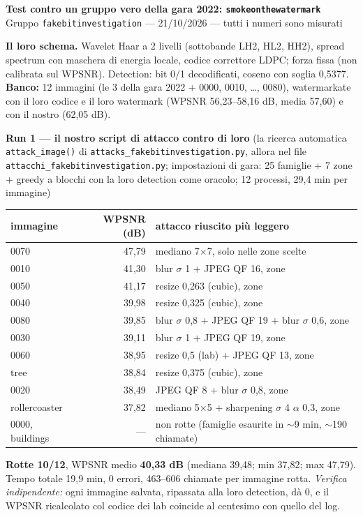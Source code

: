 \documentclass[10pt,a4paper]{article}
\begin{document}
{\Large\bfseries Test contro un gruppo vero della gara 2022: \texttt{smokeonthewatermark}}\\[2pt]
{\small Gruppo \texttt{fakebitinvestigation} — 21/10/2026 — tutti i numeri sono misurati}

\textbf{Il loro schema.} Wavelet Haar a 2 livelli (sottobande LH2, HL2, HH2), spread spectrum con maschera di energia locale, codice correttore LDPC; forza fissa (non calibrata sul WPSNR). Detection: bit 0/1 decodificati, coseno con soglia 0,5377. \textbf{Banco:} 12 immagini (le 3 della gara 2022 + 0000, 0010, \dots, 0080), watermarkate con il loro codice e il loro watermark (WPSNR 56,23–58,16 dB, media 57,60) e con il nostro (62,05 dB).

\medskip
\textbf{Run 1 — il nostro script di attacco contro di loro} (la ricerca automatica \texttt{attack\_image()} di \texttt{attacks\_fakebitinvestigation.py}, allora nel file \texttt{attacchi\_fakebitinvestigation.py}; impostazioni di gara: 25 famiglie + 7 zone + greedy a blocchi con la loro detection come oracolo; 12 processi, 29{,}4 min per immagine)

\begin{tabularx}{\linewidth}{@{}l r X@{}}
\toprule
immagine & WPSNR (dB) & attacco riuscito più leggero \\
\midrule
0070 & 47,79 & mediano 7$\times$7, solo nelle zone scelte \\
0010 & 41,30 & blur $\sigma$ 1 + JPEG QF 16, zone \\
0050 & 41,17 & resize 0,263 (cubic), zone \\
0040 & 39,98 & resize 0,325 (cubic), zone \\
0080 & 39,85 & blur $\sigma$ 0,8 + JPEG QF 19 + blur $\sigma$ 0,6, zone \\
0030 & 39,11 & blur $\sigma$ 1 + JPEG QF 19, zone \\
0060 & 38,95 & resize 0,5 (lab) + JPEG QF 13, zone \\
tree & 38,84 & resize 0,375 (cubic), zone \\
0020 & 38,49 & JPEG QF 8 + blur $\sigma$ 0,8, zone \\
rollercoaster & 37,82 & mediano 5$\times$5 + sharpening $\sigma$ 4 $\alpha$ 0,3, zone \\
0000, buildings & — & \textcolor{ko}{non rotte} (famiglie esaurite in $\sim$9 min, $\sim$190 chiamate) \\
\bottomrule
\end{tabularx}

\textcolor{ok}{\textbf{Rotte 10/12}}, WPSNR medio \textbf{40,33 dB} (mediana 39,48; min 37,82; max 47,79). Tempo totale 19,9 min, 0 errori, 463–606 chiamate per immagine rotta. \emph{Verifica indipendente:} ogni immagine salvata, ripassata alla loro detection, dà 0, e il WPSNR ricalcolato col codice dei lab coincide al centesimo con quello del log.
\end{document}
